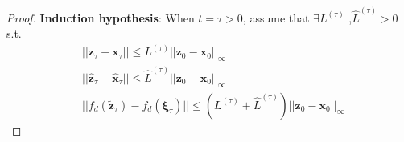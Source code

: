 \documentclass[conference]{IEEEtran}
\newtheorem{proof}{\bf Proof}
\newcommand{\myvec}[1]{\boldsymbol{#1}}
\begin{document}
\begin{proof}
    \textbf{Induction hypothesis}: When $t = \tau > 0$, assume that $\exists L^{(\tau)}$ 
    ,$\hat{L}^{(\tau)} > 0$ s.t. 
    \begin{subequations}
      \begin{align}
        &||\myvec{z}_{\tau} - \myvec{x}_{\tau}|| \leq L^{(\tau)}||\myvec{z}_{0} - \myvec{x}_{0}||_{\infty} \label{eq:nncs Lipschitz continuity 6}\\
        &||\hat{\myvec{z}}_{\tau} - \hat{\myvec{x}}_{\tau}|| \leq \hat{L}^{(\tau)}||\myvec{z}_{0} - \myvec{x}_{0}||_{\infty}\label{eq:nncs Lipschitz continuity 7}\\
        &||f_{d}(\tilde{\myvec{z}}_{\tau}) - f_{d}(\myvec{\xi}_{\tau})|| 
        \leq (L^{(\tau)} + \hat{L}^{(\tau)})|| \myvec{z}_{0} - \myvec{x}_{0} ||_{\infty}
      \end{align}
    \end{subequations}
  

\end{proof}
\end{document}
